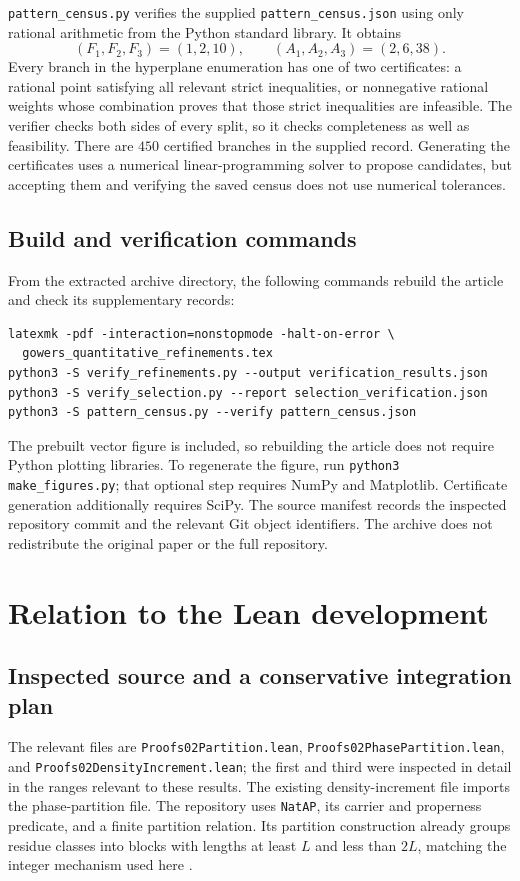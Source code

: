 \documentclass[11pt,letterpaper]{article}
\numberwithin{equation}{section}
\theoremstyle{definition}
\theoremstyle{remark}
\newcommand{\1}{\mathbf 1}
\newcommand{\srctag}[1]{\texorpdfstring{\enspace\textup{[#1]}}{ [#1]}}
\newcommand{\srcnote}[2]{\par\noindent{\small\textit{Source #1, delivered #2.}}\par}
\begin{document}
\texttt{pattern\_census.py} verifies the supplied
\texttt{pattern\_census.json} using only rational arithmetic from the
Python standard library.  It obtains
\[
 (F_1,F_2,F_3)=(1,2,10),\qquad
 (A_1,A_2,A_3)=(2,6,38).
\]
Every branch in the hyperplane enumeration has one of two certificates:
a rational point satisfying all relevant strict inequalities, or
nonnegative rational weights whose combination proves that those strict
inequalities are infeasible.  The verifier checks both sides of every
split, so it checks completeness as well as feasibility.
There are \(450\) certified branches in the supplied record.
Generating the certificates uses a numerical linear-programming solver
to propose candidates, but accepting them and verifying the saved census
does not use numerical tolerances.

\subsection{Build and verification commands}

From the extracted archive directory, the following commands rebuild the
article and check its supplementary records:
\begin{verbatim}
latexmk -pdf -interaction=nonstopmode -halt-on-error \
  gowers_quantitative_refinements.tex
python3 -S verify_refinements.py --output verification_results.json
python3 -S verify_selection.py --report selection_verification.json
python3 -S pattern_census.py --verify pattern_census.json
\end{verbatim}
The prebuilt vector figure is included, so rebuilding the article does
not require Python plotting libraries.  To regenerate the figure, run
\texttt{python3 make\_figures.py}; that optional step requires NumPy and
Matplotlib.  Certificate generation additionally requires SciPy.
The source manifest records the inspected repository commit and the
relevant Git object identifiers.  The archive does not redistribute the
original paper or the full repository.

\section[{Relation to the Lean development\srctag{05}}]{Relation to the Lean development}\label{gsr:fz:05:sec:d7}
\srcnote{05}{Section 7}
\label{gsr:fz:05:sec:lean}

\subsection{Inspected source and a conservative integration plan}
The relevant files are \texttt{Proofs02Partition.lean}, \texttt{Proofs02PhasePartition.lean}, and \texttt{Proofs02DensityIncrement.lean}; the first and third were inspected in detail in the ranges relevant to these results. The existing density-increment file imports the phase-partition file. The repository uses \texttt{NatAP}, its carrier and properness predicate, and a finite partition relation. Its partition construction already groups residue classes into blocks with lengths at least $L$ and less than $2L$, matching the integer mechanism used here \cite{repo05partition}.
\end{document}
